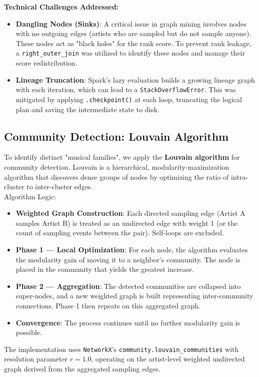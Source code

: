 \documentclass[a4paper, 12pt]{article}
\begin{document}
\textbf{Technical Challenges Addressed:}
\begin{itemize}
    \item \textbf{Dangling Nodes (Sinks)}: A critical issue in graph mining involves nodes with no outgoing edges (artists who are sampled but do not sample anyone). These nodes act as "black holes" for the rank score. To prevent rank leakage, a \texttt{right\_outer\_join} was utilized to identify these nodes and manage their score redistribution.
    \item \textbf{Lineage Truncation}: Spark’s lazy evaluation builds a growing lineage graph with each iteration, which can lead to a \texttt{StackOverflowError}. This was mitigated by applying \texttt{.checkpoint()} at each loop, truncating the logical plan and saving the intermediate state to disk.
\end{itemize}

\subsection{Community Detection: Louvain Algorithm}
To identify distinct "musical families", we apply the \textbf{Louvain algorithm} for community detection\cite{blondel2008louvain}. Louvain is a hierarchical, modularity-maximization algorithm that discovers dense groups of nodes by optimizing the ratio of intra-cluster to inter-cluster edges.
\\
Algorithm Logic:
\begin{itemize}
    \item \textbf{Weighted Graph Construction}: Each directed sampling edge (Artist A samples Artist B) is treated as an undirected edge with weight 1 (or the count of sampling events between the pair). Self-loops are excluded.
    \item \textbf{Phase 1 — Local Optimization}: For each node, the algorithm evaluates the modularity gain of moving it to a neighbor's community. The node is placed in the community that yields the greatest increase.
    \item \textbf{Phase 2 — Aggregation}: The detected communities are collapsed into super-nodes, and a new weighted graph is built representing inter-community connections. Phase 1 then repeats on this aggregated graph.
    \item \textbf{Convergence}: The process continues until no further modularity gain is possible.
\end{itemize}
The implementation uses \texttt{NetworkX}'s \texttt{community.louvain\_communities} with resolution parameter $r = 1.0$, operating on the artist-level weighted undirected graph derived from the aggregated sampling edges.
\end{document}

